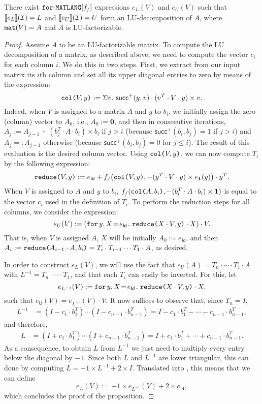 \begin{proposition}\label{prop:gauss}
There exist $\langforf{f_/}$ expressions $e_L(V)$ and $e_U(V)$ such that
$\sem{e_L}{\I}=L$ and $\sem{e_U}{\I}=U$ form an LU-decomposition of $A$,
where $\conc(V)=A$ and $A$ is LU-factorizable.
\end{proposition}
\begin{proof}
Assume $A$ to be an LU-factorizable matrix. To compute the LU decomposition of a matrix, as described above, we need to compute the vector $c_i$ for each column $i$. We do this in two steps. First, we extract from our input matrix its $i$th column and set all its upper diagonal entries to zero
by means of 
 the 
 expression:
$$\ccol{V}{y} := \Sigma v. \  \mathsf{succ}^+(y,v)\cdot(v^T\cdot V \cdot y)\times v.$$
Indeed, when $V$ is assigned to a matrix $A$ and $y$ to $b_i$, we initially assign the zero (column) vector to $A_0$, i.e., 
$A_0:=\mathbf{0}$, and then in consecutive iterations,  $A_j:=A_{j-1}+ (b_j^T\cdot A\cdot b_i)\times b_i$ if $j>i$ (because $\mathsf{succ}^+(b_i,b_j)=1$ if $j>i$) and $A_j=:A_{j-1}$ otherwise (because $\mathsf{succ}^+(b_i,b_j)=0$ for $j\leq i$). The result of this evaluation is the desired column vector.
Using $\ccol{V}{y}$, we can now compute $T_i$ by the following expression:
$$\red{V}{y} := e_{\mathsf{Id}}+ f_/\bigl(\ccol{V}{y},-(y^T\cdot V\cdot y)\times e_{\ones}(y)\bigr)\cdot y^T.$$
When $V$ is assigned to $A$ and $y$ to $b_i$, $f_/(\ccol{A}{b_i},-(b_i^T\cdot A\cdot b_i)\times \ones)$ is equal to the vector $c_i$ used in the definition of $T_i$. To perform the reduction steps for all columns, we consider
the expression:
$$
e_{U}(V) :=  \left( \initf{e_{\mathsf{Id}}}{y}{X}{\red{X\cdot V}{y}\cdot X} \right) \cdot V.
$$
That is, when $V$ is assigned $A$, $X$ will be initially $A_0:=e_{\mathsf{Id}}$, and then
$A_i:=\red{A_{i-1}\cdot A}{b_i}=T_i\cdot T_{i-1}\cdots T_1\cdot A$, as desired.

In order to construct $e_L(V)$, we will use the fact that $e_U(A)=T_n\cdot\cdots\cdot T_1\cdot A$ with $L^{-1}=T_n\cdot\cdots\cdot T_1$, and that each $T_i$ can easily be inverted. For this, let
    $$
    e_{L^{-1}}(V) :=  \initf{e_{\mathsf{Id}}}{y}{X}{\red{X\cdot V}{y}\cdot X}.
    $$
    such that	$e_{\mathsf{U}}(V)=  e_{L^{-1}}(V) \cdot V$. It now suffices to observe that, since $T_n=I$,
    \begin{align*}
    L^{-1}&=(I-c_1\cdot b_1^T)\cdots (I-c_{n-1}\cdot  b_{n-1}^T)
    =I-c_1\cdot b_1^T-\cdots - c_{n-1}\cdot b_{n-1}^T,
    \end{align*}
and therefore,    
    \begin{align*}
    L&=(I+c_1\cdot b_1^T)\cdots (I+c_{n-1}\cdot b_{n-1}^T) =I+c_1\cdot b_1^T+\cdots + c_{n-1}\cdot b_{n-1}^T.
    \end{align*}
    As a consequence, to obtain $L$ from $L^{-1}$ we just need to multiply every entry below the diagonal by $-1$. Since both  $L$ and $L^{-1}$ are lower triangular, this can done 
    by computing $L=-1\times L^{-1} + 2\times I$. Translated into \langfor, this means that we can define
    $$
    e_{L}(V) :=  -1\times e_{L^{-1}}(V) + 2\times e_{\mathsf{Id}},
    $$
    which concludes the proof of the proposition.    
\end{proof}


